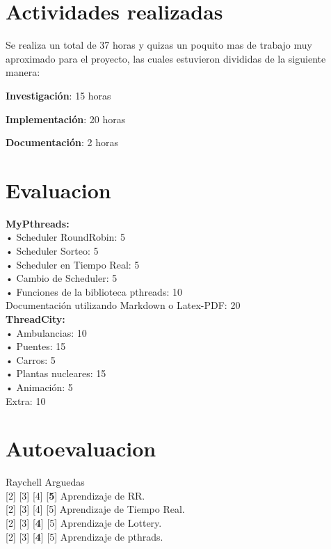 \documentclass{article}
\begin{document}
\newpage
\section{Actividades realizadas}

Se realiza un total de 37 horas y quizas un poquito mas de trabajo muy aproximado para el proyecto, las cuales estuvieron divididas de la siguiente manera:\\

\item \textbf{Investigación}: 15 horas
\item \textbf{Implementación}: 20 horas 
\item \textbf{Documentación}: 2 horas



\newpage
\section{Evaluacion}
\textbf{MyPthreads:}\\
• Scheduler RoundRobin: 5 \\
• Scheduler Sorteo: 5 \\
• Scheduler en Tiempo Real: 5 \\
• Cambio de Scheduler: 5 \\
• Funciones de la biblioteca pthreads: 10 \\
Documentación utilizando Markdown o Latex-PDF: 20 \\
\textbf{ThreadCity:}\\
• Ambulancias: 10 \\
• Puentes: 15 \\
• Carros: 5 \\
• Plantas nucleares: 15 \\
• Animación: 5 \\
Extra: 10 \\
\newpage
 \section{Autoevaluacion}

Raychell Arguedas \\
[1] [2] [3] [4] [\textbf{5}] Aprendizaje de RR.\\
[\textbf{1}] [2] [3] [4] [5] Aprendizaje de Tiempo Real.\\
[1] [2] [3] [\textbf{4}] [5] Aprendizaje de Lottery.\\
[1] [2] [3] [\textbf{4}] [5] Aprendizaje de pthrads.\\
\end{document}

